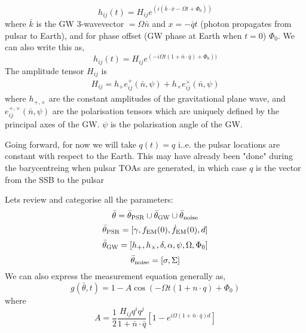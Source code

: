 \documentclass[fleqn,usenatbib,useAMS]{mnras}
\begin{document}
\begin{equation}
	h_{ij}(t) = H_{ij} e^{(i(\bar{k} \cdot \bar{x} - \Omega t + \Phi_0))}
\end{equation}
where $\bar{k}$ is the GW 3-wavevector $=\Omega \bar{n}$ and $x = -\bar{q} t$ (photon propagates from pulsar to Earth), and for phase offset (GW phase at Earth when $t=0$) $\Phi_0$.  We can also write this as,
\begin{equation}
h_{ij}(t) = H_{ij} e^{(-i\Omega t (1 + \bar{n} \cdot \bar{q} ) + \Phi_0))}
\end{equation}
The amplitude tensor  $H_{ij}$ is
\begin{eqnarray}
	H_{ij} = h_+ e_{ij}^+(\bar{n},\psi) + h_{\times} e_{ij}^{\times}(\bar{n},\psi)
\end{eqnarray}
where $h_{+,\times}$ are the constant amplitudes of the gravitational plane wave, and $e_{ij}^{+, \times}(\bar{n}, \psi)$ are the polarisation tensors which are uniquely defined by the principal axes of the GW. $\psi$ is the polarisation angle of the GW. \newline 


\noindent Going forward, for now we will take $q(t) = q$ i..e. the pulsar locations are constant with respect to the Earth. This may have already been "done" during the barycentreing when pulsar TOAs are generated, in which case $q$ is the vector from the SSB to the pulsar  \newline 


\noindent Lets review and categorise all the parameters:
\begin{equation}
	\bar{\theta} =  \bar{\theta}_{\rm PSR} \cup \bar{\theta}_{\rm GW} \cup \bar{\theta}_{\rm noise}
\end{equation}
\begin{equation}
	\bar{\theta}_{\rm PSR} = [\gamma, f_{\rm EM}(0), \dot{f}_{\rm EM}(0),d]
\end{equation}
\begin{equation}
	\bar{\theta}_{\rm GW} = [h_{+}, h_{\times}, \delta, \alpha, \psi, \Omega, \Phi_0]
\end{equation}
\begin{equation}
	\bar{\theta}_{\rm noise} = [\sigma, \Sigma]
\end{equation}
We can also express the measurement equation generally as,
\begin{equation} 
	g(\bar{\theta},t) = 1 -A \cos(-\Omega t (1 + n\cdot q ) + \Phi_0)
\end{equation}
where 
\begin{equation}
	A =  \frac{1}{2} \frac{H_{ij} q^i q^j}{1 + \bar{n} \cdot \bar{q}}[1 - e^{i \Omega(1+\bar{n} \cdot \bar{q}) d}]
\end{equation}
\end{document}
